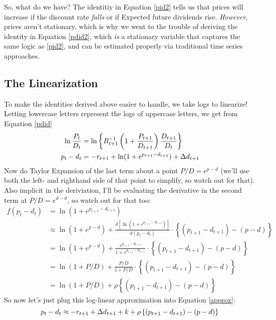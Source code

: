 \documentclass[a4paper,12pt]{scrartcl}
\begin{document}
So, what do we have? The identitiy in Equation \ref{pid2} tells us that 
prices will increase if the discount rate \emph{falls} or if Expected
future dividends rise.  \emph{However}, prices aren't stationary, which
is why we went to the trouble of deriving the identity in 
Equation \ref{pdid2}, which \emph{is} a stationary variable that 
captures the same logic as \ref{pid2}, and can be estimated properly
via traditional time series approaches.
    

\subsection{The Linearization}

To make the identities derived above easier to handle, we take 
logs to linearize!
Letting lowercase letters represent the logs of uppercase letters, we
get from Equation \ref{pdid}
\begin{align}
    \ln \frac{P_t}{D_t} &= 
	\ln \left\{ R^{-1}_{t+1} \left( 1 + \frac{P_{t+1}}{D_{t+1}}\right) \frac{D_{t+1}}{D_t}
	\right\} \notag \\
	p_t - d_t &= -r_{t+1} + \ln( 1 + e^{p_{t+1} - d_{t+1}})
	+ \Delta d_{t+1} \label{approx}
\end{align}
Now do Taylor Expansion of the last term about a point $P/D = e^{p-d}$ 
(we'll use both the left- and righthand side of that point to 
simplify, so watch out for that).  Also implicit in the
deriviation, I'll be evaluating the derivative in the second
term at $P/D = e^{d-d}$, so watch out for that too:
\begin{align*}
    f(p_t - d_t) &= \ln(1 + e^{p_{t+1} - d_{t+1}}) \\
    &\approx \ln(1 + e^{p - d}) + 
	\frac{d\left[\ln(1 + e^{p_{t+1} - d_{t+1}})\right]}{d(p_t - d_t)} 
	\cdot \left\{ (p_{t+1}-d_{t+1}) - (p-d) \right\} \\
    &= \ln(1 + e^{p - d}) + 
	\frac{e^{p_{t+1} - d_{t+1}}}{1+e^{p_{t+1} - d_{t+1}}} 
	\cdot \left\{ (p_{t+1}-d_{t+1}) - (p-d) \right\} \\
     &= \ln(1 + {P}/{D}) + 
	\frac{P/D}{1+P/D}
	\cdot \left\{ (p_{t+1}-d_{t+1}) - (p-d) \right\} \\
    &= \ln(1 + {P}/{D}) + 
	\rho\left\{ (p_{t+1}-d_{t+1}) - (p-d) \right\} 
\end{align*}
So now let's just plug this log-linear approximation into Equation
\ref{approx}:
\begin{equation}
    p_t - d_t \approx -r_{t+1}
	+ \Delta d_{t+1} +  k + 
	\rho\left\{ (p_{t+1}-d_{t+1}) - (p-d) \right\} \\
\end{equation}
\end{document}
